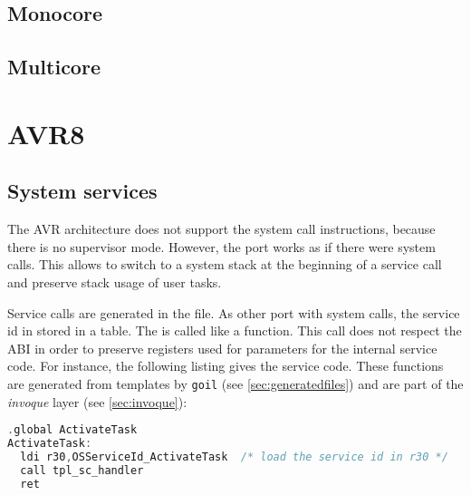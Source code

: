 \subsection{Monocore}

\subsection{Multicore}


\section{AVR8}
\label{sec:avr8port}

\subsection{System services} \label{sec:avr8portSystemService}

The AVR architecture does not support the system call instructions, because there is no supervisor mode. However, the port works as if there were system calls. This allows to switch to a system stack at the beginning of a service call and preserve stack usage of user tasks. 

Service calls are generated in the  file. As other port with system calls, the service id in stored in a table. The  is called like a function. This call does not respect the ABI in order to preserve registers used for parameters for the internal service code. For instance, the following listing gives the  service code. These functions are generated from templates by \texttt{goil} (see \ref{sec:generatedfiles}) and are part of the {\em invoque} layer (see \ref{sec:invoque}):

\begin{lstlisting}[language=C]
  .global ActivateTask
ActivateTask:
  ldi r30,OSServiceId_ActivateTask  /* load the service id in r30 */
  call tpl_sc_handler
  ret
\end{lstlisting}

%

